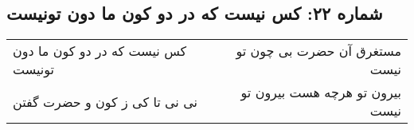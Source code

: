\begin{center}
\section*{شماره ۲۲: کس نیست که در دو کون ما دون تونیست}
\label{sec:022}
\begin{longtable}{l p{0.5cm} r}
کس نیست که در دو کون ما دون تونیست
&&
مستغرق آن حضرت بی چون تو نیست
\\
نی نی تا کی ز کون و حضرت گفتن
&&
بیرون تو هرچه هست بیرون تو نیست
\\
\end{longtable}
\end{center}
